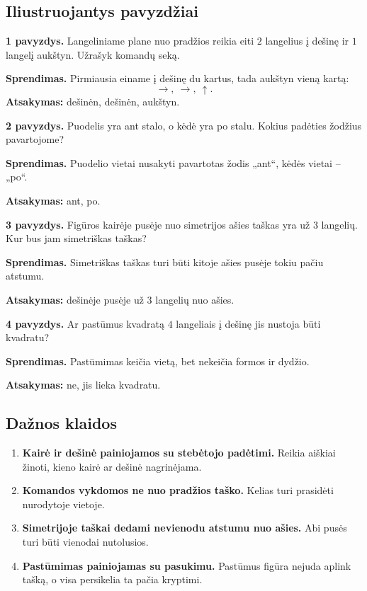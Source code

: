 \subsection{Iliustruojantys pavyzdžiai}

\textbf{1 pavyzdys.} Langeliniame plane nuo pradžios reikia eiti \(2\) langelius į dešinę ir \(1\) langelį aukštyn. Užrašyk komandų seką.

\textbf{Sprendimas.} Pirmiausia einame į dešinę du kartus, tada aukštyn vieną kartą:
\[
\rightarrow,\ \rightarrow,\ \uparrow.
\]
\textbf{Atsakymas:} dešinėn, dešinėn, aukštyn.

\textbf{2 pavyzdys.} Puodelis yra ant stalo, o kėdė yra po stalu. Kokius padėties žodžius pavartojome?

\textbf{Sprendimas.} Puodelio vietai nusakyti pavartotas žodis „ant“, kėdės vietai -- „po“.

\textbf{Atsakymas:} ant, po.

\textbf{3 pavyzdys.} Figūros kairėje pusėje nuo simetrijos ašies taškas yra už \(3\) langelių. Kur bus jam simetriškas taškas?

\textbf{Sprendimas.} Simetriškas taškas turi būti kitoje ašies pusėje tokiu pačiu atstumu.

\textbf{Atsakymas:} dešinėje pusėje už \(3\) langelių nuo ašies.

\textbf{4 pavyzdys.} Ar pastūmus kvadratą \(4\) langeliais į dešinę jis nustoja būti kvadratu?

\textbf{Sprendimas.} Pastūmimas keičia vietą, bet nekeičia formos ir dydžio.

\textbf{Atsakymas:} ne, jis lieka kvadratu.

\subsection{Dažnos klaidos}

\begin{enumerate}
\item \textbf{Kairė ir dešinė painiojamos su stebėtojo padėtimi.} Reikia aiškiai žinoti, kieno kairė ar dešinė nagrinėjama.
\item \textbf{Komandos vykdomos ne nuo pradžios taško.} Kelias turi prasidėti nurodytoje vietoje.
\item \textbf{Simetrijoje taškai dedami nevienodu atstumu nuo ašies.} Abi pusės turi būti vienodai nutolusios.
\item \textbf{Pastūmimas painiojamas su pasukimu.} Pastūmus figūra nejuda aplink tašką, o visa persikelia ta pačia kryptimi.
\end{enumerate}

